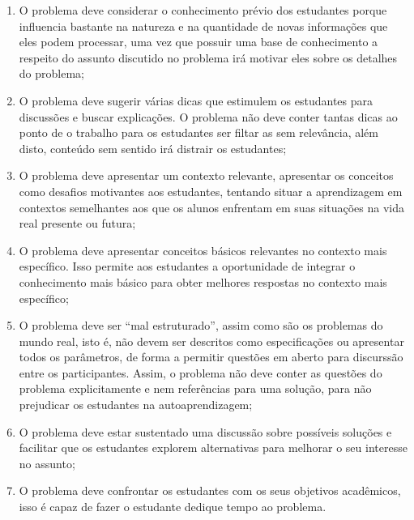 \begin{enumerate}
\item{O problema deve considerar o conhecimento
prévio dos estudantes porque influencia bastante na
natureza e na quantidade de novas informações que
eles podem processar, uma vez que possuir
uma base de conhecimento a respeito do assunto
discutido no problema irá motivar eles sobre os
detalhes do problema;}
\item{O problema deve sugerir várias dicas
que estimulem os estudantes para discussões
e buscar explicações. O problema não deve
conter tantas dicas ao ponto de o trabalho
para os estudantes ser filtar as sem relevância,
além disto, conteúdo sem sentido irá distrair
os estudantes;}
\item{O problema deve apresentar um contexto relevante,
apresentar os conceitos como desafios motivantes aos
estudantes, tentando situar a aprendizagem em contextos
semelhantes aos que os alunos enfrentam em suas
situações na vida real presente ou futura;}
\item{O problema deve apresentar conceitos básicos
relevantes no contexto mais específico.
Isso permite aos estudantes a oportunidade
de integrar o conhecimento mais básico para obter melhores
respostas no contexto mais específico;}
\item{O problema deve ser ``mal estruturado'', assim como
são os problemas do mundo real, isto é, não
devem ser descritos como especificações ou apresentar
todos os parâmetros, de forma a permitir questões em
aberto para discurssão entre os participantes.
Assim, o problema não deve conter as questões do problema
explicitamente e nem referências para uma solução,
para não prejudicar os estudantes na
autoaprendizagem;}
\item{O problema deve estar sustentado uma discussão
sobre possíveis soluções e facilitar que os estudantes
explorem alternativas para melhorar o seu interesse
no assunto;}
\item{O problema deve confrontar os estudantes com
os seus objetivos acadêmicos, isso é capaz de
fazer o estudante dedique tempo ao problema.}
\end{enumerate}

